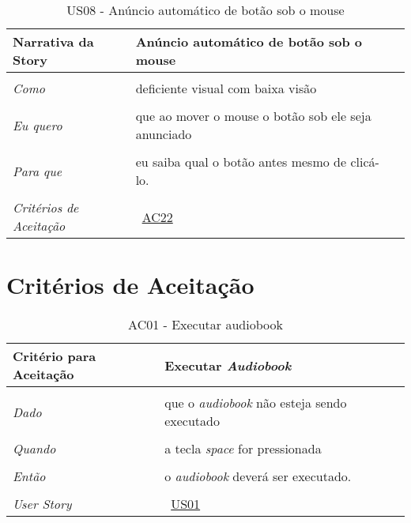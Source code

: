 \begin{apendicesenv}
\begin{table}[ht]
\centering
\caption{US08 - Anúncio automático de botão sob o mouse}
\vspace{0.1cm}
\begin{center}
\begin{tabularx}{\textwidth}{|lX|l|}

\hline 
\textbf{Narrativa da Story} & Anúncio automático de botão sob o mouse \\
\hline
 & \\
\textit{Como} & deficiente visual com baixa visão \\
 & \\
\textit{Eu quero} & que ao mover o mouse o botão sob ele seja anunciado \\
 & \\
\textit{Para que} & eu saiba qual o botão antes mesmo de clicá-lo. \\
 & \\
\hline
\textit{Critérios de Aceitação} & ~\hyperref[tab:us01a22]{AC22} \\
\hline

\end{tabularx}
\end{center}
\label{tab:us08}
\end{table}



\chapter{Critérios de Aceitação}\label{criterios}


\begin{table}[ht]
\centering
\caption{AC01 - Executar audiobook}
\vspace{0.1cm}
\begin{center}
\begin{tabularx}{\textwidth}{|lX|l|}

\hline
\textbf{Critério para Aceitação} & Executar \textit{Audiobook} \\
\hline
 & \\			
\textit{Dado} & que o \textit{audiobook} não esteja sendo executado \\
 & \\
\textit{Quando} & a tecla \textit{space} for pressionada \\
 & \\
\textit{Então} & o \textit{audiobook} deverá ser executado. \\
 & \\
\hline
\textit{User Story} & ~\hyperref[tab:us01]{US01} \\
\hline


\end{tabularx}
\end{center}
\end{table}
\end{apendicesenv}

